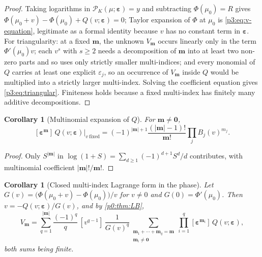 \documentclass[11pt,a4paper,oneside]{book}
\theoremstyle{plain}
\newtheorem{corollary}[theorem]{Corollary}
\theoremstyle{definition}
\theoremstyle{remark}
\newcommand{\Coef}[1]{[#1]\,}
\begin{document}
\begin{proof}
Taking logarithms in $\mathcal{P}_{K}(\mu;\boldsymbol\varepsilon)=y$ and subtracting
$\Phi(\mu_{0})=R$ gives $\Phi(\mu_{0}+v)-\Phi(\mu_{0})+Q(v;\boldsymbol\varepsilon)=0$; Taylor
expansion of $\Phi$ at $\mu_{0}$ is \cref{p3:eq:v-equation}, legitimate as a formal identity
because $v$ has no constant term in $\boldsymbol\varepsilon$. For triangularity: at a fixed
$\boldsymbol m$, the unknown $V_{\boldsymbol m}$ occurs linearly only in the term
$\Phi'(\mu_{0})v$; each $v^{s}$ with $s\ge2$ needs a decomposition of $\boldsymbol m$ into at
least two non-zero parts and so uses only strictly smaller multi-indices; and every monomial of
$Q$ carries at least one explicit $\varepsilon_{j}$, so an occurrence of $V_{\boldsymbol m}$
inside $Q$ would be multiplied into a strictly larger multi-index. Solving the coefficient
equation gives \cref{p3:eq:triangular}. Finiteness holds because a fixed multi-index has finitely
many additive decompositions.
\end{proof}

\begin{corollary}[Multinomial expansion of $Q$]\label{p3:cor:Q-multi}
For $\boldsymbol m\ne\boldsymbol0$,
\begin{equation}\label{p3:eq:Q-multi}
 \Coef{\boldsymbol\varepsilon^{\boldsymbol m}}Q(v;\boldsymbol\varepsilon)\Big|_{v\ \mathrm{fixed}}
 =(-1)^{|\boldsymbol m|+1}\frac{(|\boldsymbol m|-1)!}{\boldsymbol m!}\prod_{j}B_{j}(v)^{m_{j}} .
\end{equation}
\end{corollary}

\begin{proof}
Only $S^{|\boldsymbol m|}$ in $\log(1+S)=\sum_{d\ge1}(-1)^{d+1}S^{d}/d$ contributes, with
multinomial coefficient $|\boldsymbol m|!/\boldsymbol m!$.
\end{proof}

\begin{corollary}[Closed multi-index Lagrange form in the phase]
\label{p3:cor:phase-LB}
Let $G(v)=\bigl(\Phi(\mu_{0}+v)-\Phi(\mu_{0})\bigr)/v$ for $v\ne0$ and $G(0)=\Phi'(\mu_{0})$. Then
$v=-Q(v;\boldsymbol\varepsilon)/G(v)$, and by \cref{p0:thm:LB},
\begin{equation}\label{p3:eq:phase-LB}
 V_{\boldsymbol m}=\sum_{q=1}^{|\boldsymbol m|}\frac{(-1)^{q}}{q}\,\Coef{v^{q-1}}
 \frac1{G(v)^{q}}
 \sum_{\substack{\boldsymbol m_{1}+\cdots+\boldsymbol m_{q}=\boldsymbol m\\ \boldsymbol m_{i}\ne\boldsymbol 0}}
 \prod_{i=1}^{q}\Coef{\boldsymbol\varepsilon^{\boldsymbol m_{i}}}Q(v;\boldsymbol\varepsilon),
\end{equation}
both sums being finite.
\end{corollary}
\end{document}
